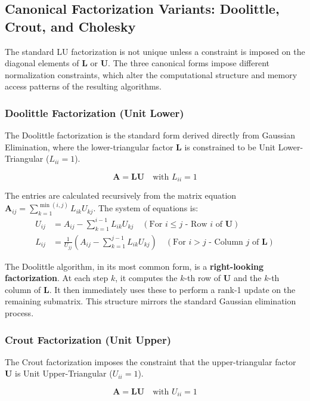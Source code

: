 \subsection{Canonical Factorization Variants: Doolittle, Crout, and Cholesky}

The standard LU factorization is not unique unless a constraint is imposed on the diagonal elements of $\mathbf{L}$ or $\mathbf{U}$. The three canonical forms impose different normalization constraints, which alter the computational structure and memory access patterns of the resulting algorithms.

\subsubsection{Doolittle Factorization (Unit Lower)}
The Doolittle factorization is the standard form derived directly from Gaussian Elimination, where the lower-triangular factor $\mathbf{L}$ is constrained to be Unit Lower-Triangular ($L_{ii} = 1$).

\[ \mathbf{A} = \mathbf{L}\mathbf{U} \quad \text{with } L_{ii} = 1 \]

The entries are calculated recursively from the matrix equation $\mathbf{A}_{ij} = \sum_{k=1}^{\min(i, j)} L_{ik} U_{kj}$. The system of equations is:
\begin{align} U_{ij} &= A_{ij} - \sum_{k=1}^{i-1} L_{ik} U_{kj} \quad (\text{For } i \le j \text{ - Row } i \text{ of } \mathbf{U}) \\ L_{ij} &= \frac{1}{U_{jj}} \left( A_{ij} - \sum_{k=1}^{j-1} L_{ik} U_{kj} \right) \quad (\text{For } i > j \text{ - Column } j \text{ of } \mathbf{L}) \end{align}

The Doolittle algorithm, in its most common form, is a \textbf{right-looking factorization}. At each step $k$, it computes the $k$-th row of $\mathbf{U}$ and the $k$-th column of $\mathbf{L}$. It then immediately uses these to perform a rank-1 update on the remaining submatrix. This structure mirrors the standard Gaussian elimination process.

\subsubsection{Crout Factorization (Unit Upper)}
The Crout factorization imposes the constraint that the upper-triangular factor $\mathbf{U}$ is Unit Upper-Triangular ($U_{ii} = 1$).

\[ \mathbf{A} = \mathbf{L}\mathbf{U} \quad \text{with } U_{ii} = 1 \]

